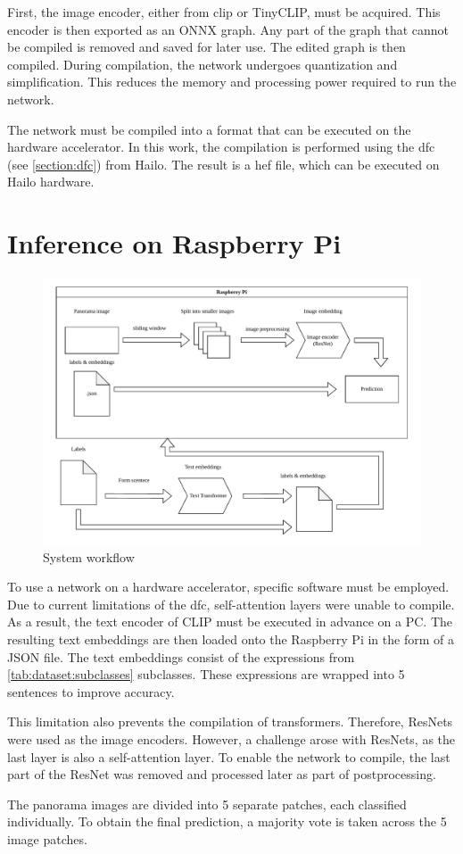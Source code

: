First, the image encoder, either from \acrshort{clip} or TinyCLIP, must be acquired.  
This encoder is then exported as an ONNX graph.  
Any part of the graph that cannot be compiled is removed and saved for later use.  
The edited graph is then compiled.  
During compilation, the network undergoes quantization and simplification.  
This reduces the memory and processing power required to run the network.  

The network must be compiled into a format that can be executed on the hardware accelerator.  
In this work, the compilation is performed using the \Acrlong{dfc} (see \cref{section:dfc}) from Hailo.  
The result is a \acrshort{hef} file, which can be executed on Hailo hardware.


\section{Inference on Raspberry Pi}

\begin{figure}
    \centering
    \includegraphics[width=\textwidth]{Images/SystemOverview/Overview.drawio.pdf}
    \caption{System workflow}
    \label{fig:overview:overview}
\end{figure}

To use a network on a hardware accelerator, specific software must be employed.  
Due to current limitations of the \acrshort{dfc}, self-attention layers were unable to compile.  
As a result, the text encoder of CLIP must be executed in advance on a PC.  
The resulting text embeddings are then loaded onto the Raspberry Pi in the form of a JSON file.  
The text embeddings consist of the expressions from \cref{tab:dataset:subclasses} subclasses.  
These expressions are wrapped into 5 sentences to improve accuracy.  

This limitation also prevents the compilation of transformers.  
Therefore, ResNets were used as the image encoders.  
However, a challenge arose with ResNets, as the last layer is also a self-attention layer.  
To enable the network to compile, the last part of the ResNet was removed and processed later as part of postprocessing.  

The panorama images are divided into 5 separate patches, each classified individually.  
To obtain the final prediction, a majority vote is taken across the 5 image patches.


